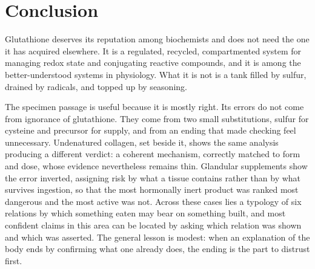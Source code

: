 \documentclass[11pt,a4paper]{article}
\theoremstyle{plain}
\theoremstyle{definition}
\theoremstyle{remark}
\begin{document}
\section{Conclusion}

Glutathione deserves its reputation among biochemists and does not need the one it has acquired elsewhere. It is a regulated, recycled, compartmented system for managing redox state and conjugating reactive compounds, and it is among the better-understood systems in physiology. What it is not is a tank filled by sulfur, drained by radicals, and topped up by seasoning.

The specimen passage is useful because it is mostly right. Its errors do not come from ignorance of glutathione. They come from two small substitutions, sulfur for cysteine and precursor for supply, and from an ending that made checking feel unnecessary. Undenatured collagen, set beside it, shows the same analysis producing a different verdict: a coherent mechanism, correctly matched to form and dose, whose evidence nevertheless remains thin. Glandular supplements show the error inverted, assigning risk by what a tissue contains rather than by what survives ingestion, so that the most hormonally inert product was ranked most dangerous and the most active was not. Across these cases lies a typology of six relations by which something eaten may bear on something built, and most confident claims in this area can be located by asking which relation was shown and which was asserted. The general lesson is modest: when an explanation of the body ends by confirming what one already does, the ending is the part to distrust first.
\end{document}
